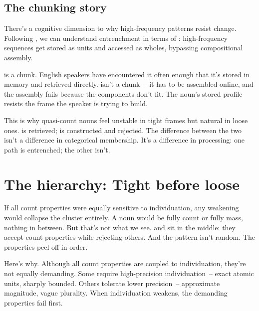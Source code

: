 \subsection{The chunking story}
\label{sec:9:chunking}

There's a cognitive dimension to why high-frequency patterns resist change. Following \textcite{bybee2010}, we can understand entrenchment in terms of : high-frequency sequences get stored as units and accessed as wholes, bypassing compositional assembly.

 is a chunk. English speakers have encountered it often enough that it's stored in memory and retrieved directly.  isn't a chunk~-- it has to be assembled online, and the assembly fails because the components don't fit. The noun's stored profile resists the frame the speaker is trying to build.

This is why quasi-count nouns feel unstable in tight frames but natural in loose ones.  is retrieved;  is constructed and rejected. The difference between the two isn't a difference in categorical membership. It's a difference in processing: one path is entrenched; the other isn't.

\section{The hierarchy: Tight before loose}
\label{sec:9:hierarchy}

If all count properties were equally sensitive to individuation, any weakening would collapse the cluster entirely. A noun would be fully count or fully mass, nothing in between. But that's not what we see.  and  sit in the middle: they accept  count properties while rejecting others. And the pattern isn't random. The properties peel off in order.

Here's why. Although all count properties are coupled to individuation, they're not equally demanding. Some require high-precision individuation~-- exact atomic units, sharply bounded. Others tolerate lower precision~-- approximate magnitude, vague plurality. When individuation weakens, the demanding properties fail first.

